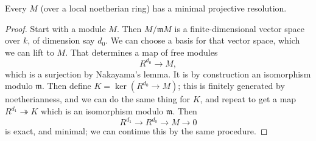 \begin{proposition}
Every $M$ (over a local noetherian ring) has a minimal
projective resolution.
\end{proposition}
\begin{proof}
Start with a module $M$. Then $M/\mathfrak{m}M$ is a
finite-dimensional vector
space over $k$, of dimension say $d_0$. We can
choose a basis for that vector space, which
we can lift to $M$. That determines a map of free modules
\[ R^{d_0} \to M,  \]
which is a surjection by Nakayama's lemma. It is by construction
an
isomorphism modulo $\mathfrak{m}$. Then define $K =
\ker(R^{d_0}\to M)$; this
is finitely generated by noetherianness, and we
can do the same thing for $K$, and repeat to get a map $R^{d_1}
\twoheadrightarrow K$ which is an isomorphism modulo
$\mathfrak{m}$. Then
\[ R^{d_1} \to R^{d_0} \to M \to 0  \]
is exact, and minimal; we can continue this by the same
procedure.
\end{proof}


